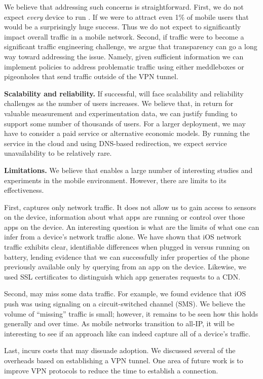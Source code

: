 We believe that addressing such concerns is straightforward. First, we do not 
expect \emph{every} device to run \meddle. If we were to attract even 1\% of 
mobile users that would be a surprisingly huge success. Thus we do not expect 
\meddle to significantly impact overall traffic in a mobile network. Second, if \meddle 
traffic were to become a significant traffic engineering challenge, we argue that 
transparency can go a long way toward addressing the issue. Namely, 
given sufficient information we can implement policies to address problematic traffic using either 
meddleboxes or pigeonholes that send traffic outside of the VPN 
tunnel. 

\noindent\textbf{Scalability and reliability.} If successful, \meddle will 
face scalability and reliability challenges as the number of users increases. 
We believe that, in return for valuable measurement and experimentation data, 
we can justify funding to support some number of thousands of users. For a 
larger deployment, we may have to consider a paid service or alternative 
economic models. By running the service in the cloud and using DNS-based 
redirection, we expect service unavailability to be relatively rare. 

\noindent\textbf{Limitations.} We believe that \meddle enables a large number 
of interesting studies and experiments in the mobile environment. However, 
there are limits to its effectiveness. 

First, \meddle captures only network traffic. It does 
not allow us to gain access to sensors on the device, information about what 
apps are running or control over those apps on the device. An interesting question 
is what are the limits of what one can infer from a device's network traffic alone. 
We have shown that iOS network traffic exhibits clear, identifiable differences 
when plugged in versus running on battery, lending evidence that we can successfully 
infer properties of the phone previously available only by querying from an app 
on the device. Likewise, we used SSL certificates to distinguish which app generates 
requests to a CDN.

Second, \meddle may miss some data traffic. For example, we found evidence that 
iOS push was using signaling on a circuit-switched channel (SMS). We believe 
the volume of ``missing'' traffic is small; however, it remains to be seen how 
this holds generally and over time. As mobile networks transition to all-IP, it will 
be interesting to see if an approach like \meddle can indeed capture all of a device's traffic.

Last, \meddle incurs costs that may dissuade adoption. We discussed several of the 
overheads based on establishing a VPN tunnel. One area of future work is to improve 
VPN protocols to reduce the time to establish a connection. 
